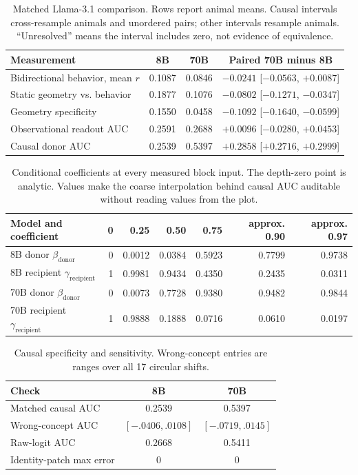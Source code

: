\documentclass[letterpaper]{article}
\begin{document}
\begin{table}[t]
\centering
\caption{Matched Llama-3.1 comparison. Rows report animal means. Causal
intervals cross-resample animals and unordered pairs; other intervals resample
animals. ``Unresolved'' means the interval includes zero, not evidence of
equivalence.}
\label{tab:summary}
\begin{tabular}{lccc}
\toprule
Measurement & 8B & 70B & Paired 70B minus 8B \\
\midrule
Bidirectional behavior, mean $r$ & 0.1087 & 0.0846 & $-0.0241$ [$-0.0563$, $+0.0087$] \\
Static geometry vs. behavior & 0.1877 & 0.1076 & $-0.0802$ [$-0.1271$, $-0.0347$] \\
Geometry specificity & 0.1550 & 0.0458 & $-0.1092$ [$-0.1640$, $-0.0599$] \\
Observational readout AUC & 0.2591 & 0.2688 & $+0.0096$ [$-0.0280$, $+0.0453$] \\
Causal donor AUC & 0.2539 & 0.5397 & $+0.2858$ [$+0.2716$, $+0.2999$] \\
\bottomrule
\end{tabular}
\end{table}

\begin{table}[t]
\centering
\small
\caption{Conditional coefficients at every measured block input. The depth-zero
point is analytic. Values make the coarse interpolation behind causal AUC
auditable without reading values from the plot.}
\label{tab:depth}
\begin{tabular}{lrrrrrr}
\toprule
Model and coefficient & 0 & 0.25 & 0.50 & 0.75 & approx. 0.90 & approx. 0.97 \\
\midrule
8B donor $\beta_{\mathrm{donor}}$ & 0 & 0.0012 & 0.0384 & 0.5923 & 0.7799 & 0.9738 \\
8B recipient $\gamma_{\mathrm{recipient}}$ & 1 & 0.9981 & 0.9434 & 0.4350 & 0.2435 & 0.0311 \\
70B donor $\beta_{\mathrm{donor}}$ & 0 & 0.0073 & 0.7728 & 0.9380 & 0.9482 & 0.9844 \\
70B recipient $\gamma_{\mathrm{recipient}}$ & 1 & 0.9888 & 0.1888 & 0.0716 & 0.0610 & 0.0197 \\
\bottomrule
\end{tabular}
\end{table}

\begin{table}[t]
\centering
\small
\caption{Causal specificity and sensitivity. Wrong-concept entries are ranges
over all 17 circular shifts.}
\label{tab:controls}
\begin{tabular}{@{}lcc@{}}
\toprule
Check & 8B & 70B \\
\midrule
Matched causal AUC & 0.2539 & 0.5397 \\
Wrong-concept AUC & $[-.0406,.0108]$ & $[-.0719,.0145]$ \\
Raw-logit AUC & 0.2668 & 0.5411 \\
Identity-patch max error & 0 & 0 \\
\bottomrule
\end{tabular}
\end{table}
\end{document}
